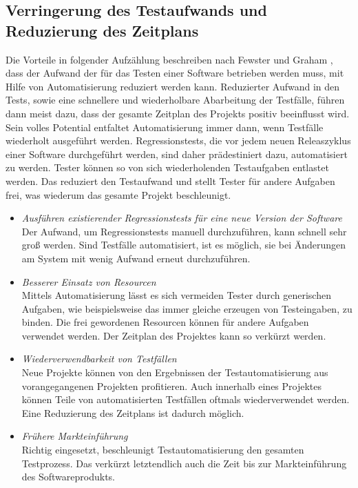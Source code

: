 \subsection{Verringerung des Testaufwands und Reduzierung des Zeitplans}
\label{sec:verringerung_des_testaufwands_und_reduzierung_des_zeitplans}
Die Vorteile in folgender Aufzählung beschreiben nach Fewster und Graham \cite[vgl. S. 9 ff.]{fewster_software_1999}, dass der Aufwand der für das Testen einer Software betrieben werden muss, mit Hilfe von Automatisierung reduziert werden kann.
Reduzierter Aufwand in den Tests, sowie eine schnellere und wiederholbare Abarbeitung der Testfälle, führen dann meist dazu, dass der gesamte Zeitplan des Projekts positiv beeinflusst wird. Sein volles Potential entfaltet Automatisierung immer dann, wenn Testfälle wiederholt ausgeführt werden. Regressionstests, die vor jedem neuen Releaszyklus einer Software durchgeführt werden, sind daher prädestiniert dazu, automatisiert zu werden. Tester können so von sich wiederholenden Testaufgaben entlastet werden. Das reduziert den Testaufwand und stellt Tester für andere Aufgaben frei, was wiederum das gesamte Projekt beschleunigt.

\begin{itemize}
\item \textit{Ausführen existierender Regressionstests für eine neue Version der Software} \\
Der Aufwand, um Regressionstests manuell durchzuführen, kann schnell sehr groß werden. Sind Testfälle automatisiert, ist es möglich, sie bei Änderungen am System mit wenig Aufwand erneut durchzuführen.
\item \textit{Besserer Einsatz von Resourcen} \\
Mittels Automatisierung lässt es sich vermeiden Tester durch generischen Aufgaben, wie beispielsweise das immer gleiche erzeugen von Testeingaben, zu binden.
Die frei gewordenen Resourcen können für andere Aufgaben verwendet werden.
Der Zeitplan des Projektes kann so verkürzt werden. 
\item \textit{Wiederverwendbarkeit von Testfällen} \\
Neue Projekte können von den Ergebnissen der Testautomatisierung aus vorangegangenen Projekten profitieren. Auch innerhalb eines Projektes können Teile von automatisierten Testfällen oftmals wiederverwendet werden.
Eine Reduzierung des Zeitplans ist dadurch möglich.
\item \textit{Frühere Markteinführung} \\
Richtig eingesetzt, beschleunigt Testautomatisierung den gesamten Testprozess. Das verkürzt letztendlich auch die Zeit bis zur Markteinführung des Softwareprodukts. 
\end{itemize}


